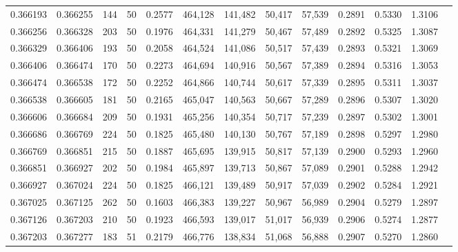 \begin{tabular}{rrrrrrrrrrrrr}
0.366193 & 0.366255 &   144 &  50 &                                     0.2577 & 464,128 & 141,482 &  50,417 &  57,539 & 0.2891 & 0.5330 & 1.3106 \\
0.366256 & 0.366328 &   203 &  50 &                                     0.1976 & 464,331 & 141,279 &  50,467 &  57,489 & 0.2892 & 0.5325 & 1.3087 \\
0.366329 & 0.366406 &   193 &  50 &                                     0.2058 & 464,524 & 141,086 &  50,517 &  57,439 & 0.2893 & 0.5321 & 1.3069 \\
0.366406 & 0.366474 &   170 &  50 &                                     0.2273 & 464,694 & 140,916 &  50,567 &  57,389 & 0.2894 & 0.5316 & 1.3053 \\
0.366474 & 0.366538 &   172 &  50 &                                     0.2252 & 464,866 & 140,744 &  50,617 &  57,339 & 0.2895 & 0.5311 & 1.3037 \\
0.366538 & 0.366605 &   181 &  50 &                                     0.2165 & 465,047 & 140,563 &  50,667 &  57,289 & 0.2896 & 0.5307 & 1.3020 \\
0.366606 & 0.366684 &   209 &  50 &                                     0.1931 & 465,256 & 140,354 &  50,717 &  57,239 & 0.2897 & 0.5302 & 1.3001 \\
0.366686 & 0.366769 &   224 &  50 &                                     0.1825 & 465,480 & 140,130 &  50,767 &  57,189 & 0.2898 & 0.5297 & 1.2980 \\
0.366769 & 0.366851 &   215 &  50 &                                     0.1887 & 465,695 & 139,915 &  50,817 &  57,139 & 0.2900 & 0.5293 & 1.2960 \\
0.366851 & 0.366927 &   202 &  50 &                                     0.1984 & 465,897 & 139,713 &  50,867 &  57,089 & 0.2901 & 0.5288 & 1.2942 \\
0.366927 & 0.367024 &   224 &  50 &                                     0.1825 & 466,121 & 139,489 &  50,917 &  57,039 & 0.2902 & 0.5284 & 1.2921 \\
0.367025 & 0.367125 &   262 &  50 &                                     0.1603 & 466,383 & 139,227 &  50,967 &  56,989 & 0.2904 & 0.5279 & 1.2897 \\
0.367126 & 0.367203 &   210 &  50 &                                     0.1923 & 466,593 & 139,017 &  51,017 &  56,939 & 0.2906 & 0.5274 & 1.2877 \\
0.367203 & 0.367277 &   183 &  51 &                                     0.2179 & 466,776 & 138,834 &  51,068 &  56,888 & 0.2907 & 0.5270 & 1.2860 \\

\end{tabular}
